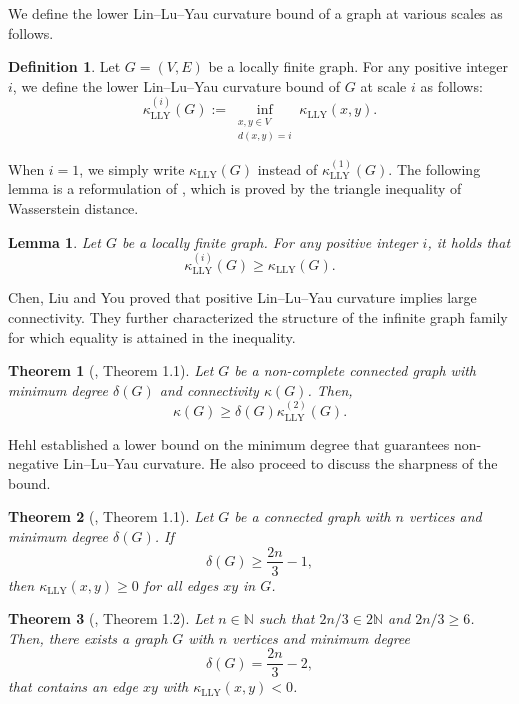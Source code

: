 \documentclass[10pt,a4paper]{article}
\newtheorem{theorem}{Theorem}[section]
\newtheorem{lemma}{Lemma}[section]
\theoremstyle{definition}
\newtheorem{defi}{Definition}[section]
\theoremstyle{definition}
\theoremstyle{nonumber}
\begin{document}
We define the lower Lin--Lu--Yau curvature bound of a graph at various scales as follows.

\begin{defi}
Let $G = (V, E)$ be a locally finite graph. For any positive integer $i$, we define the lower Lin--Lu--Yau curvature bound of $G$ at scale $i$ as follows:
$$
\kappa_{\mathrm{LLY}}^{(i)}(G) := \inf_{\substack{x, y \in V \\ d(x, y) = i}} \kappa_{\mathrm{LLY}}(x, y).
$$
\end{defi} 

When $i = 1$, we simply write $\kappa_{\mathrm{LLY}}(G)$ instead of $\kappa_{\mathrm{LLY}}^{(1)}(G)$. The following lemma is a reformulation of \cite[Lemma 2.3]{LLY}, which is proved by the triangle inequality of Wasserstein distance.

\begin{lemma}\label{triangle inequality}
Let $G$ be a locally finite graph. For any positive integer $i$, it holds that
$$
\kappa_{\mathrm{LLY}}^{(i)}(G) \geq \kappa_{\mathrm{LLY}}(G).
$$
\end{lemma}

Chen, Liu and You proved that positive Lin--Lu--Yau curvature implies large connectivity. 
They further characterized the structure of the infinite graph family for which equality is attained in the inequality.

\begin{theorem}[\cite{Liu}, Theorem 1.1]\label{Liu}
Let $G$ be a non-complete connected graph with minimum degree $\delta(G)$ and connectivity $\kappa(G)$. Then,
$$
\kappa(G) \geq \delta(G)  \kappa_{\mathrm{LLY}}^{(2)}(G).
$$
\end{theorem}

Hehl established a lower bound on the minimum degree that guarantees non-negative Lin--Lu--Yau curvature. He also proceed to discuss the sharpness of the bound.

\begin{theorem}[\cite{Hehlmin}, Theorem 1.1]\label{Hehlmin}
Let $G$ be a connected graph with $n$ vertices and minimum degree $\delta(G)$. If$$\delta(G)\geq \frac{2n}{3}-1,$$ then $\kappa_{\mathrm{LLY}}(x,y)\geq0$ for all edges $xy$ in $G$.
\end{theorem}

\begin{theorem}[\cite{Hehlmin}, Theorem 1.2]\label{Hehlmin sharpness}
Let $n \in \mathbb{N}$ such that $2n/3 \in 2\mathbb{N}$ and $2n/3 \geq 6$. Then, there exists a graph $G$ with $n$ vertices and minimum degree $$\delta(G) = \frac{2n}{3} - 2,$$ that contains an edge $xy$ with $\kappa_{\mathrm{LLY}}(x, y) < 0$.
\end{theorem}
\end{document}
